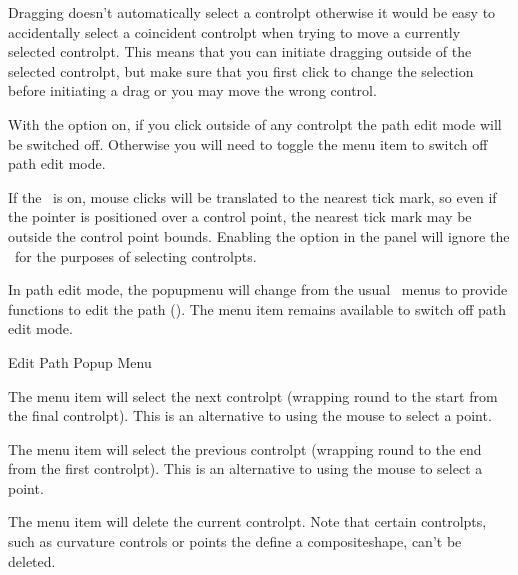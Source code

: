 Dragging doesn't automatically select a \gls{controlpt} otherwise it
would be easy to accidentally select a coincident \gls{controlpt}
when trying to move a currently selected \gls{controlpt}.
This means that you can initiate dragging outside of the selected
\gls*{controlpt}, but make sure that you
first click to change the selection before initiating a drag or you
may move the wrong control.

\begin{important}
With the  option on, if you
click outside of any \gls{controlpt} the path edit mode will be
switched off. Otherwise you will need to toggle the
 menu item to switch off path edit mode.
\end{important}

If the \gridlock\ is on, mouse clicks will be translated to the
nearest tick mark, so even if the pointer is positioned over a
control point, the nearest tick mark may be outside the control
point bounds. Enabling the  option in 
the  panel will ignore the \gridlock\ for the
purposes of selecting \glspl{controlpt}.


In path edit mode, the \gls{popupmenu} will change from the usual
\selectmode\ menus to provide functions to edit the \gls{path}
().
The  menu item remains available to switch off path edit mode.

 {}
 {Edit Path Popup Menu}


The  menu item will select the next \gls{controlpt}
(wrapping round to the start from the final \gls{controlpt}).
This is an alternative to using the mouse to select a point.


The  menu item will select the previous \gls{controlpt}
(wrapping round to the end from the first \gls{controlpt}).
This is an alternative to using the mouse to select a point.


The  menu item will delete the current
\gls{controlpt}. 
Note that certain \glspl{controlpt}, such as curvature controls or points
the define a \gls{compositeshape}, can't be deleted.

